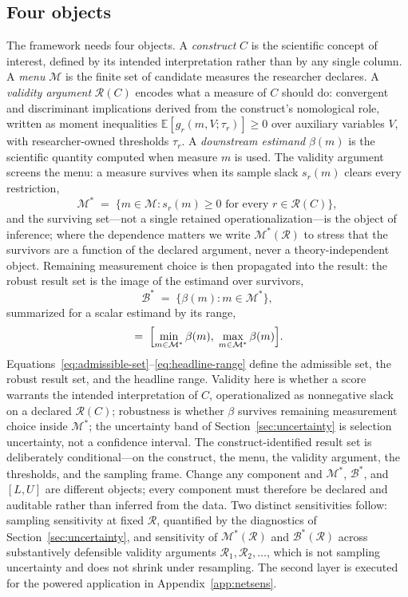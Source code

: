 \documentclass[10pt,letterpaper]{article}
\newcommand{\M}{\ensuremath{\mathcal{M}}}
\newcommand{\E}{\mathbb{E}}
\newcommand{\Rset}{\mathcal{R}}
\newcommand{\Bset}{\mathcal{B}}
\begin{document}
\subsection{Four objects}
The framework needs four objects.
A \emph{construct} $C$ is the scientific concept of interest, defined by its intended interpretation rather than by any single column.
A \emph{menu} $\M$ is the finite set of candidate measures the researcher declares.
A \emph{validity argument} $\Rset(C)$ encodes what a measure of $C$ should do: convergent and discriminant implications derived from the construct's nomological role, written as moment inequalities $\E[g_r(m,V;\tau_r)]\ge 0$ over auxiliary variables $V$, with researcher-owned thresholds $\tau_r$.
A \emph{downstream estimand} $\beta(m)$ is the scientific quantity computed when measure $m$ is used.
The validity argument screens the menu: a measure survives when its sample slack $s_r(m)$ clears every restriction,
\begin{equation}
\M^* \;=\; \bigl\{ m \in \M : s_r(m) \ge 0 \text{ for every } r \in \Rset(C) \bigr\},
\label{eq:admissible-set}
\end{equation}
and the surviving set---not a single retained operationalization---is the object of inference; where the dependence matters we write $\M^*(\Rset)$ to stress that the survivors are a function of the declared argument, never a theory-independent object.
Remaining measurement choice is then propagated into the result: the robust result set is the image of the estimand over survivors,
\begin{equation}
\Bset^* \;=\; \bigl\{ \beta(m) : m \in \M^* \bigr\},
\label{eq:robust-image}
\end{equation}
summarized for a scalar estimand by its range,
\begin{equation}
[L,U] \;=\; \Bigl[ \min_{m\in\M^*} \beta(m),\; \max_{m\in\M^*} \beta(m) \Bigr].
\label{eq:headline-range}
\end{equation}
Equations~\eqref{eq:admissible-set}--\eqref{eq:headline-range} define the admissible set, the robust result set, and the headline range.
Validity here is whether a score warrants the intended interpretation of $C$, operationalized as nonnegative slack on a declared $\Rset(C)$; robustness is whether $\beta$ survives remaining measurement choice inside $\M^*$; the uncertainty band of Section~\ref{sec:uncertainty} is selection uncertainty, not a confidence interval.
The construct-identified result set is deliberately conditional---on the construct, the menu, the validity argument, the thresholds, and the sampling frame.
Change any component and $\M^*$, $\Bset^*$, and $[L,U]$ are different objects; every component must therefore be declared and auditable rather than inferred from the data.
Two distinct sensitivities follow: sampling sensitivity at fixed $\Rset$, quantified by the diagnostics of Section~\ref{sec:uncertainty}, and sensitivity of $\M^*(\Rset)$ and $\Bset^*(\Rset)$ across substantively defensible validity arguments $\Rset_1,\Rset_2,\ldots$, which is not sampling uncertainty and does not shrink under resampling.
The second layer is executed for the powered application in Appendix~\ref{app:netsens}.
\end{document}
